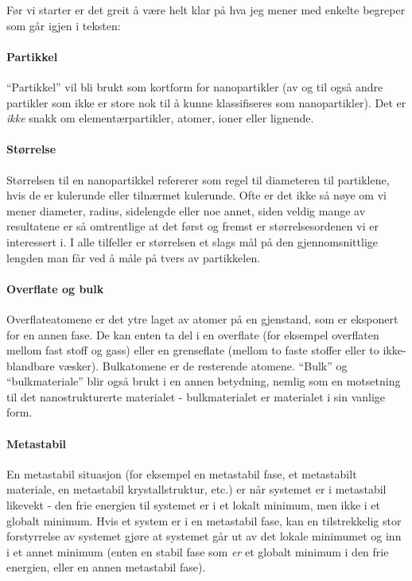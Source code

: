 \noindent Før vi starter er det greit å være helt klar på hva jeg mener med enkelte begreper som går igjen i teksten:

\paragraph{Partikkel} ``Partikkel'' vil bli brukt som kortform for nanopartikler (av og til også andre partikler som ikke er store nok til å kunne klassifiseres som nanopartikler). Det er \emph{ikke} snakk om elementærpartikler, atomer, ioner eller lignende.

\paragraph{Størrelse} Størrelsen til en nanopartikkel refererer som regel til diameteren til partiklene, hvis de er kulerunde eller tilnærmet kulerunde. Ofte er det ikke så nøye om vi mener diameter, radius, sidelengde eller noe annet, siden veldig mange av resultatene er så omtrentlige at det først og fremst er størrelsesordenen vi er interessert i. I alle tilfeller er størrelsen et slags mål på den gjennomsnittlige lengden man får ved å måle på tvers av partikkelen.

\paragraph{Overflate og bulk} Overflateatomene er det ytre laget av atomer på en gjenstand, som er eksponert for en annen fase. De kan enten ta del i en overflate (for eksempel overflaten mellom fast stoff og gass) eller en grenseflate (mellom to faste stoffer eller to ikke-blandbare væsker). Bulkatomene er de resterende atomene. ``Bulk'' og ``bulkmateriale'' blir også brukt i en annen betydning, nemlig som en motsetning til det nanostrukturerte materialet - bulkmaterialet er materialet i sin vanlige form.

\paragraph{Metastabil} En metastabil situasjon (for eksempel en metastabil fase, et metastabilt materiale, en metastabil krystallstruktur, etc.) er når systemet er i metastabil likevekt - den frie energien til systemet er i et lokalt minimum, men ikke i et globalt minimum. Hvis et system er i en metastabil fase, kan en tilstrekkelig stor forstyrrelse av systemet gjøre at systemet går ut av det lokale minimumet og inn i et annet minimum (enten en stabil fase som \emph{er} et globalt minimum i den frie energien, eller en annen metastabil fase). 
\vfill
